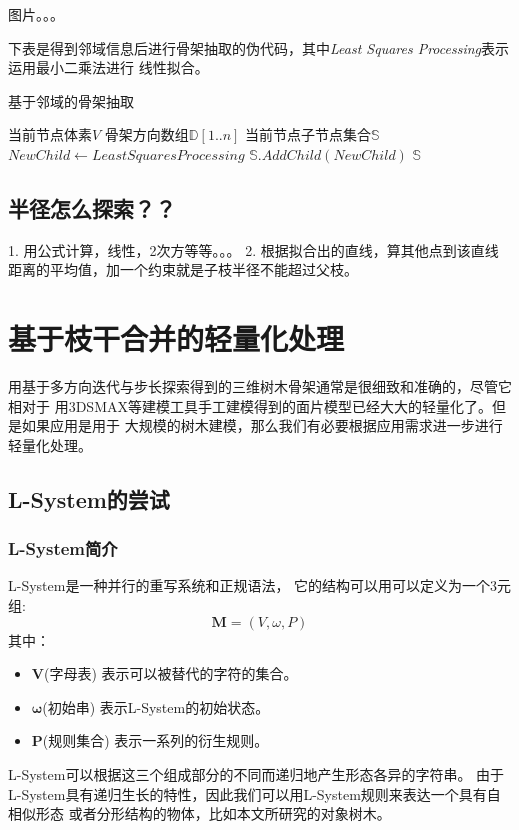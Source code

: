 图片。。。

下表是得到邻域信息后进行骨架抽取的伪代码，其中\textit{Least Squares Processing}表示运用最小二乘法进行
线性拟合。

\begin{algorithm}
	\caption{基于邻域的骨架抽取}
	\begin{algorithmic}[1]
		\Require 当前节点体素$V$
		\Require 骨架方向数组$\mathbb{D}[1..n]$
		\Ensure 当前节点子节点集合$\mathbb{S}$
			\State $NewChild\gets Least Squares Processing$
			\State $\mathbb{S}.AddChild(NewChild)$
		\EndFor
		\State \Return $\mathbb{S}$
	\end{algorithmic}
\end{algorithm}

\subsection{半径怎么探索？？}
1. 用公式计算，线性，2次方等等。。。
2. 根据拟合出的直线，算其他点到该直线距离的平均值，加一个约束就是子枝半径不能超过父枝。

\section{基于枝干合并的轻量化处理}
\label{sec:branchcombine}
用基于多方向迭代与步长探索得到的三维树木骨架通常是很细致和准确的，尽管它相对于
用3DSMAX等建模工具手工建模得到的面片模型已经大大的轻量化了。但是如果应用是用于
大规模的树木建模，那么我们有必要根据应用需求进一步进行轻量化处理。

\subsection{L-System的尝试}
\label{subsec:lsystem}

\subsubsection{L-System简介}
L-System是一种并行的重写系统和正规语法，
它的结构可以用可以定义为一个3元组:\\
\[\mathbf{M} = (V, \omega, P)\]
其中：\\
\begin{itemize}
	\item $\mathbf{V}$(字母表) 表示可以被替代的字符的集合。
	\item $\mathbf{\omega}$(初始串) 表示L-System的初始状态。
	\item $\mathbf{P}$(规则集合) 表示一系列的衍生规则。
\end{itemize}
L-System可以根据这三个组成部分的不同而递归地产生形态各异的字符串。
由于L-System具有递归生长的特性，因此我们可以用L-System规则来表达一个具有自相似形态
或者分形结构的物体，比如本文所研究的对象\raisebox{0.5mm}{------}树木。


